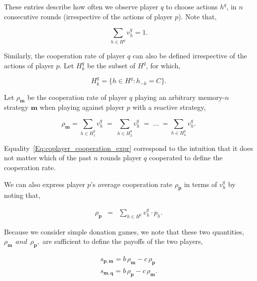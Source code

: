 \documentclass{article}
\theoremstyle{definition}
\begin{document}
These entries describe how often we observe player $q$ to choose actions $h^q$,
in $n$ consecutive rounds (irrespective of the actions of player $p$).
Note that,

\begin{equation}\label{eq:normalization_marginal_distributions}
  \displaystyle \sum_{h \in H^q} v^q_{h} = 1.
\end{equation}

Similarly, the cooperation rate of player $q$ can also be defined irrespective
of the actions of player $p$. Let $H^{q}_{k}$ be the subset of $H^{q}$, for which,

\begin{equation}
  H^{q}_{k} = \{h \in H^q : h_{-k} = C\}.
\end{equation}

Let $\rho_\mathbf{m}$ be the cooperation rate of
player $q$ playing an arbitrary memory-$n$ strategy $\mathbf{m}$ when playing
against player $p$ with a reactive strategy,

\begin{equation}\label{Eq:coplayer_cooperation_expr}
  \rho_\mathbf{m} = \sum_{h \in H^{q}_{1}} v^q_{h} \; = \; \sum_{h \in H^{q}_{2}} v^q_{h} \; = \; \dots \; = \sum_{h \in H^{q}_{n}} v^q_{h}.
\end{equation}

Equality~\eqref{Eq:coplayer_cooperation_expr} correspond to the intuition that
it does not matter which of the past $n$ rounds player $q$ cooperated to define
the cooperation rate.

We can also express player $p$'s average cooperation rate $\rho_\mathbf{p}$ in terms
of $v^q_{h}$ by noting that,

\begin{equation} \label{Eq:rhop_alln}
  \begin{array}{lll}
    \rho_\mathbf{p} &= &\displaystyle \sum_{h \in H^q} v^q_{h} \cdot p_{h}.
  \end{array}
\end{equation}

Because we consider simple donation games, we note that these two quantities,
$\rho_\mathbf{m}  ~~and~~ \rho_\mathbf{p},$ are
sufficient to define the payoffs of the two players,

\begin{equation} \label{Eq:payoff}
  \begin{array}{lll}
  s_{\mathbf{p}, \mathbf{m}}  =  b\, \rho_\mathbf{m} - c\, \rho_\mathbf{p}\\
  s_{\mathbf{m}, \mathbf{q}} = b\, \rho_\mathbf{p} - c\, \rho_\mathbf{m}.
  \end{array}
\end{equation}
\end{document}
